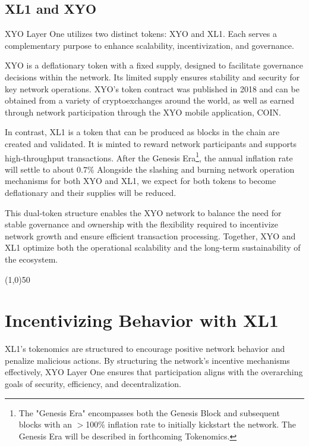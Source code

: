 \documentclass{article}
\begin{document}
\subsection{XL1 and XYO}
XYO Layer One utilizes two distinct tokens: XYO and XL1. Each serves a
complementary purpose to enhance scalability, incentivization, and governance.

XYO is a deflationary token with a fixed supply, designed to facilitate
governance decisions within the network. Its limited supply ensures stability
and security for key network operations. XYO's token contract was published in
2018 and can be obtained from a variety of cryptoexchanges around the world, as
well as earned through network participation through the XYO mobile
application, COIN.

In contrast, XL1 is a token that can be produced as blocks in the chain are
created and validated. It is minted to reward network participants and supports
high-throughput transactions. After the Genesis Era\footnote{The "Genesis Era"
    encompasses both the Genesis Block and subsequent blocks with an $>$100\%
    inflation rate to initially kickstart the network. The Genesis Era will be
    described in forthcoming Tokenomics.}, the annual inflation rate will settle to
about \(0.7\%\) Alongside the slashing and burning network operation mechanisms
for both XYO and XL1, we expect for both tokens to become deflationary and
their supplies will be reduced.

This dual-token structure enables the XYO network to balance the need for
stable governance and ownership with the flexibility required to incentivize
network growth and ensure efficient transaction processing. Together, XYO and
XL1 optimize both the operational scalability and the long-term sustainability
of the ecosystem.

\begin{center}
    \line(1,0){50}
\end{center}

\section{Incentivizing Behavior with XL1}
XL1's tokenomics are structured to encourage positive network behavior and
penalize malicious actions. By structuring the network's incentive mechanisms
effectively, XYO Layer One ensures that participation aligns with the
overarching goals of security, efficiency, and decentralization.
\end{document}
